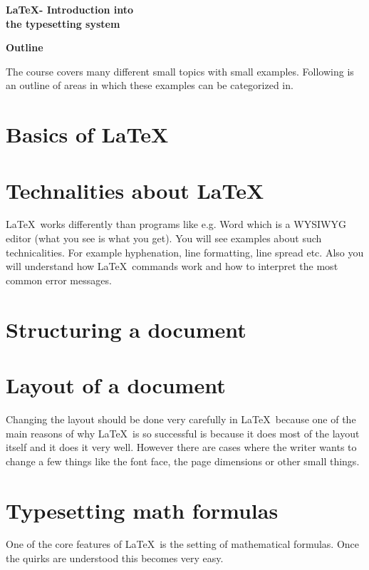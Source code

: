 \documentclass[10pt]{scrartcl}
\begin{document}
{

\hspace*{\fill}\Huge\bfseries \LaTeX - Introduction into\hspace*{\fill} \\\hspace*{\fill}the typesetting system\hspace*{\fill}

\vspace{0.8cm}

\hspace*{\fill}\huge\bfseries  Outline \hspace*{\fill}

\vspace{1cm}
}

The course covers many different small topics with small examples. Following is an outline of areas in which these examples can be categorized in.

    \section{Basics of \LaTeX} %

    \section{Technalities about \LaTeX}
    \LaTeX\ works differently than programs like e.g. Word which is a WYSIWYG editor (what you see is what you get). You will see examples about such technicalities. For example hyphenation, line formatting, line spread etc. Also you will understand how \LaTeX\ commands work and how to interpret the most common error messages.

    \section{Structuring a document}

    \section{Layout of a document}
    Changing the layout should be done very carefully in \LaTeX\ because one of the main reasons of why \LaTeX\ is so successful is because it does most of the layout itself and it does it very well. However there are cases where the writer wants to change a few things like the font face, the page dimensions or other small things.

    \section{Typesetting math formulas}
    One of the core features of \LaTeX\ is the setting of mathematical formulas. Once the quirks are understood this becomes very easy.
\end{document}
